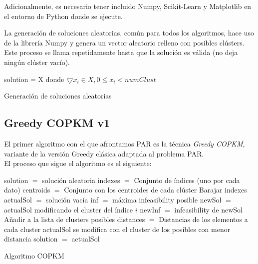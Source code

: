 \vspace{\baselineskip}

Adicionalmente, es necesario tener incluido Numpy, Scikit-Learn y Matplotlib en el entorno de Python donde se ejecute.

\vspace{\baselineskip}

La generación de soluciones aleatorias, común para todos los algoritmos, hace uso de la librería Numpy y genera un vector aleatorio relleno con posibles clústers. Este proceso se llama repetidamente hasta que la solución es válida (no deja ningún clúster vacío). \\

\begin{algorithm}[H]
    \SetAlgoLined
         {
            solution = X donde $\bigtriangledown x_i \in X, 0 \leq x_i < numClust $ \;
        }
    \caption{Generación de soluciones aleatorias}
\end{algorithm}

\newpage


\subsection{Greedy COPKM v1}
El primer algoritmo con el que afrontamos PAR es la técnica \textit{Greedy COPKM}, variante de la versión Greedy clásica adaptada al problema PAR. \\

El proceso que sigue el algoritmo es el siguiente: \\

\begin{algorithm}[H]
    \SetAlgoLined
        solution $=$ solución aleatoria \;
        indexes $=$ Conjunto de índices (uno por cada dato) \;
        centroids $=$ Conjunto con los centroides de cada clúster \;
        Barajar indexes \;
         {
            actualSol $=$ solución vacía \;
             {
                inf $=$ máxima infeasibility posible \;
                 {
                    newSol $=$ actualSol modificando el cluster del índice $i$ \;
                    newInf $=$ infeasibility de newSol \;
                     {
                        Añadir a la lista de clusters posibles \;
                    }
                }
                distances $=$ Distancias de los elementos a cada cluster \;
                actualSol se modifica con el cluster de los posibles con menor distancia \; 
            }
            solution $=$ actualSol \;
        }
    \caption{Algoritmo COPKM}
\end{algorithm}

